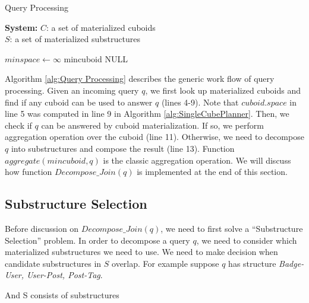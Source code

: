 \begin{algorithm}[H]
\label{alg:Query Processing}
\caption{Query Processing}
\LinesNumbered
\textbf{System:} $C$: a set of materialized cuboids\\ $S$: a set of materialized substructures\\

$minspace\leftarrow \infty $\;
mincuboid \leftarrow NULL\;
\end{algorithm}

Algorithm \ref{alg:Query Processing} describes the generic work flow of query processing. Given an incoming query $q$,
we first look up materialized cuboids and find if any cuboid can be used to answer $q$ (lines 4-9). Note that $cuboid.space$ in line 5 was computed in line 9 in Algorithm \ref{alg:SingleCubePlanner}. Then, we check if $q$ can be answered by cuboid materialization. If so, we perform aggregation operation over the cuboid (line 11). Otherwise, we need to decompose $q$ into substructures and compose the result (line 13). Function $aggregate(mincuboid, q)$ is the classic aggregation operation. We will discuss how function $Decompose\_Join(q)$ is implemented at the end of this section.

\subsection{Substructure Selection}
\label{Substructure Selection}

Before discussion on $Decompose\_Join(q)$, we need to first solve a ``Substructure Selection'' problem. In order to decompose a query $q$, we need to consider which materialized substructures we need to use. We need to make decision when candidate substructures in $S$ overlap. For example suppose $q$ has structure \textit{Badge-User, User-Post, Post-Tag}.

And S consists of substructures

